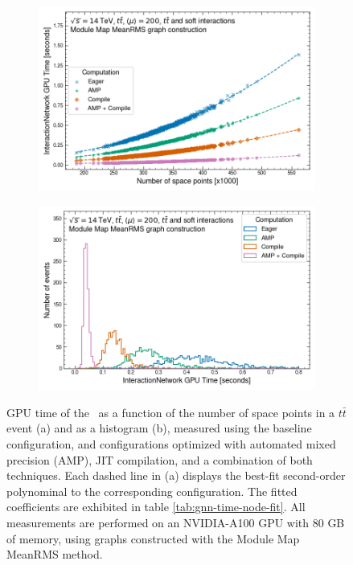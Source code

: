 \newpage
\begin{figure}[h!]
    \centering
    \begin{subfigure}[b]{0.62\textwidth}
    \centering
        \includegraphics[width=\textwidth]{figures/rms_80g.png}
        \caption{}
        \label{subfig:gnn-time-node}
    \end{subfigure}

    \begin{subfigure}[b]{0.62\textwidth}\centering
        \includegraphics[width=\textwidth]{figures/rms_80g_hist.png}
        \caption{}
        \label{subfig:gnn-time-hist}
    \end{subfigure}
    \caption{GPU time of the \ignn~as a function of the number of space points in a $t\bar{t}$ event (a) and as a histogram (b), measured using the baseline configuration, and configurations optimized with automated mixed precision (AMP), JIT compilation, and a combination of both techniques. Each dashed line in (a) displays the best-fit second-order polynominal to the corresponding configuration. The fitted coefficients are exhibited in table \ref{tab:gnn-time-node-fit}. All measurements are performed on an NVIDIA-A100 GPU with 80 GB of memory, using graphs constructed with the Module Map MeanRMS method.}
    \label{fig:gnn-time-node}
\end{figure}


